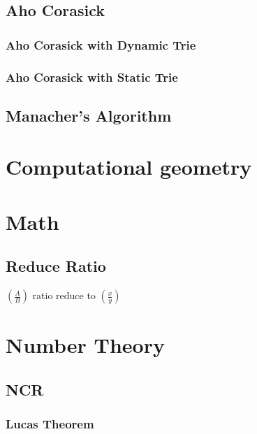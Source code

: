 \documentclass[1pt]{report}
\begin{document}
\section{Aho Corasick}
\subsection{Aho Corasick with Dynamic Trie}

\subsection{Aho Corasick with Static Trie}

\section{Manacher's Algorithm}




\chapter{Computational geometry}


\chapter{Math}
\section{Reduce Ratio}
$\left(\frac{A}{B}\right)$ ratio reduce to $\left(\frac{x}{y}\right)$


\chapter{Number Theory}
\section{NCR}
\subsection{Lucas Theorem}


\end{document}
